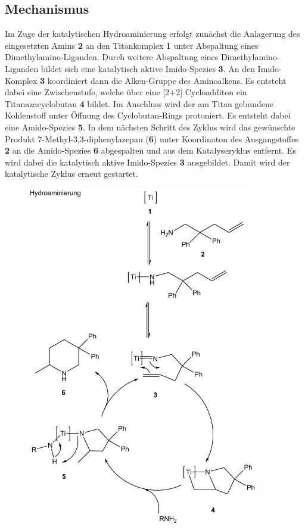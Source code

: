 \documentclass[12pt]{article}
\begin{document}
\begin{onehalfspace}
\section{Mechanismus\cite{bio}}
Im Zuge der katalytischen Hydroaminierung erfolgt zunächst die Anlagerung des eingesetzten Amins \textbf{2} an den Titankomplex \textbf{1} unter Abspaltung eines Dimethylamino-Liganden. Durch weitere Abspaltung eines Dimethylamino-Liganden bildet sich eine katalytisch aktive Imido-Spezies \textbf{3}. An den Imido-Komplex \textbf{3} koordiniert dann die Alken-Gruppe des Aminoalkens. Es entsteht dabei eine Zwischenstufe, welche über eine [2+2] Cycloadditon ein Titanazacyclobutan \textbf{4} bildet. Im Anschluss wird der am Titan gebundene Kohlenstoff unter Öffnung des Cyclobutan-Rings protoniert. Es entsteht dabei eine Amido-Spezies \textbf{5}. In dem nächsten Schritt des Zyklus wird das gewünschte Produkt 7-Methyl-3,3-diphenylazepan (\textbf{6}) unter Koordinaton des Ausgangstoffes \textbf{2} an die Amido-Spezies \textbf{6} abgespalten und aus dem Katalysezyklus entfernt. Es wird dabei die katalytisch aktive Imido-Spezies \textbf{3} ausgebildet. Damit wird der katalytische Zyklus erneut gestartet.\\
\newpage
\begin{figure}[!htbp]
\centering
\includegraphics[width=0.9\textwidth]{kat.png}
\end{figure}


\end{onehalfspace}
\end{document}

